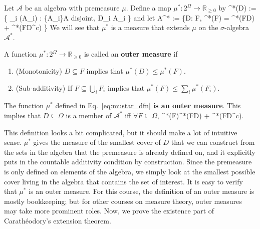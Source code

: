 \begin{definition}
	Let $\mathcal A$ be an algebra with premeasure $\mu$. Define a map $\mu^* : 2^\Omega\rightarrow\mathbb R_{\geq 0}$ by
	\eq
		\mu^*(D) := \inf \left\{ \sum_i \mu(A_i) : \{A_i\}\subseteq\mathcal A\textnormal{ disjoint}, \; D\subseteq\bigsqcup_i A_i \right\}
		\label{eq:mustar_dfn}
	\qe
	and let
	\eq
		\mathcal A^* := \left\{D\subseteq\Omega : \forall F\subseteq\Omega, \; \mu^*(F) = \mu^*(F\cap D) + \mu^*(F\cap D^c) \right\}
	\qe
	We will see that $\mu^*$ is a measure that extends $\mu$ on the $\sigma$-algebra $\mathcal A^*$. 
	\label{def:astar}
\end{definition}

\begin{definition}
	A function $\mu^* : 2^\Omega\rightarrow\mathbb R_{\geq 0}$ is called an \textbf{outer measure} if
	\begin{enumerate}
		\item (Monotonicity) $D\subseteq F$ implies that $\mu^*(D)\leq \mu^*(F)$. 
		\item (Sub-additivity) If $F\subseteq \bigcup_i F_i$ implies that $\mu^*(F)\leq \sum_i \mu^*(F_i)$. 
	\end{enumerate}
\end{definition}

\begin{prop}
	The function $\mu^*$ defined in Eq.~\eqref{eq:mustar_dfn} \textbf{is an outer measure}. This implies that $D\subseteq\Omega$ is a member of $\mathcal A^*$ iff $\forall F\subseteq\Omega$, 
	\eq
		\mu^*(F)\geq \mu^*(F\cap D) + \mu^*(F\cap D^c).
		\label{eq:astar_prop}
	\qe
\end{prop}

This definition looks a bit complicated, but it should make a lot of intuitive sense. $\mu^*$ gives the measure of the smallest cover of $D$ that we can construct from the sets in the algebra that the premeasure is already defined on, and it explicitly puts in the countable additivity condition by construction. Since the premeasure is only defined on elements of the algebra, we simply look at the smallest possible cover living in the algebra that contains the set of interest. It is easy to verify that $\mu^*$ is an outer measure. For this course, the definition of an outer measure is mostly bookkeeping; but for other courses on measure theory, outer measures may take more prominent roles. Now, we prove the existence part of Carath\'eodory's extension theorem. 

